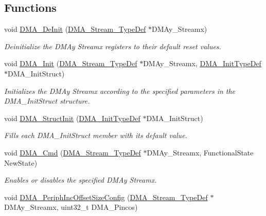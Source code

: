 \subsection*{Functions}
\begin{DoxyCompactItemize}
\item 
void \hyperlink{group___d_m_a___group1_ga38d4a4ab8990299f8a6cf064e1e811d0}{D\+M\+A\+\_\+\+De\+Init} (\hyperlink{struct_d_m_a___stream___type_def}{D\+M\+A\+\_\+\+Stream\+\_\+\+Type\+Def} $\ast$D\+M\+Ay\+\_\+\+Streamx)
\begin{DoxyCompactList}\small\item\em Deinitialize the D\+M\+Ay Streamx registers to their default reset values. \end{DoxyCompactList}\item 
void \hyperlink{group___d_m_a___group1_gaced8a4149acfb0a50b50e63273a87148}{D\+M\+A\+\_\+\+Init} (\hyperlink{struct_d_m_a___stream___type_def}{D\+M\+A\+\_\+\+Stream\+\_\+\+Type\+Def} $\ast$D\+M\+Ay\+\_\+\+Streamx, \hyperlink{struct_d_m_a___init_type_def}{D\+M\+A\+\_\+\+Init\+Type\+Def} $\ast$D\+M\+A\+\_\+\+Init\+Struct)
\begin{DoxyCompactList}\small\item\em Initializes the D\+M\+Ay Streamx according to the specified parameters in the D\+M\+A\+\_\+\+Init\+Struct structure. \end{DoxyCompactList}\item 
void \hyperlink{group___d_m_a___group1_ga0f7f95f750a90a6824f4e9b6f58adc7e}{D\+M\+A\+\_\+\+Struct\+Init} (\hyperlink{struct_d_m_a___init_type_def}{D\+M\+A\+\_\+\+Init\+Type\+Def} $\ast$D\+M\+A\+\_\+\+Init\+Struct)
\begin{DoxyCompactList}\small\item\em Fills each D\+M\+A\+\_\+\+Init\+Struct member with its default value. \end{DoxyCompactList}\item 
void \hyperlink{group___d_m_a___group1_gab2bea22f9f6dc62fdd7afb385a0c1f73}{D\+M\+A\+\_\+\+Cmd} (\hyperlink{struct_d_m_a___stream___type_def}{D\+M\+A\+\_\+\+Stream\+\_\+\+Type\+Def} $\ast$D\+M\+Ay\+\_\+\+Streamx, Functional\+State New\+State)
\begin{DoxyCompactList}\small\item\em Enables or disables the specified D\+M\+Ay Streamx. \end{DoxyCompactList}\item 
void \hyperlink{group___d_m_a___group1_ga210a9861460b3c9b3fa14fdc1a949744}{D\+M\+A\+\_\+\+Periph\+Inc\+Offset\+Size\+Config} (\hyperlink{struct_d_m_a___stream___type_def}{D\+M\+A\+\_\+\+Stream\+\_\+\+Type\+Def} $\ast$D\+M\+Ay\+\_\+\+Streamx, uint32\+\_\+t D\+M\+A\+\_\+\+Pincos)

\end{DoxyCompactItemize}
